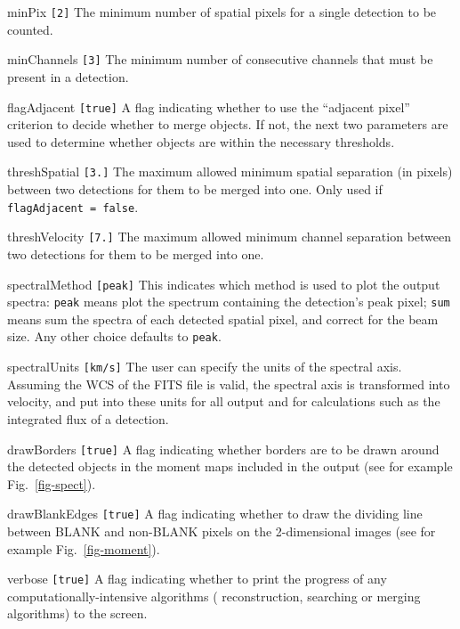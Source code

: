 \begin{entry}
\item[minPix \texttt{[2]}] The minimum number of spatial pixels for a
  single detection to be counted.
\item[minChannels \texttt{[3]}] The minimum number of consecutive
  channels that must be present in a detection.
\item[flagAdjacent \texttt{[true]}] A flag indicating whether to use
  the ``adjacent pixel'' criterion to decide whether to merge
  objects. If not, the next two parameters are used to determine
  whether objects are within the necessary thresholds.
\item[threshSpatial \texttt{[3.]}] The maximum allowed minimum spatial
  separation (in pixels) between two detections for them to be merged
  into one. Only used if \texttt{flagAdjacent = false}.
\item[threshVelocity \texttt{[7.]}] The maximum allowed minimum channel
  separation between two detections for them to be merged into
  one. 
\end{entry}

\begin{entry}
\item[spectralMethod \texttt{[peak]}] This indicates which method is used
  to plot the output spectra: \texttt{peak} means plot the spectrum
  containing the detection's peak pixel; \texttt{sum} means sum the
  spectra of each detected spatial pixel, and correct for the beam
  size. Any other choice defaults to \texttt{peak}.
\item[spectralUnits \texttt{[km/s]}] The user can specify the units of
  the spectral axis. Assuming the WCS of the FITS file is valid, the
  spectral axis is transformed into velocity, and put into these units
  for all output and for calculations such as the integrated flux of a
  detection.
\item[drawBorders \texttt{[true]}] A flag indicating whether borders
  are to be drawn around the detected objects in the moment maps
  included in the output (see for example Fig.~\ref{fig-spect}).
\item[drawBlankEdges \texttt{[true]}] A flag indicating whether to
 draw the dividing line between BLANK and non-BLANK pixels on the
 2-dimensional images (see for example Fig.~\ref{fig-moment}).
\item[verbose \texttt{[true]}] A flag indicating whether to print the
  progress of any computationally-intensive algorithms (\eg
  reconstruction, searching or merging algorithms) to the screen.
\end{entry}

